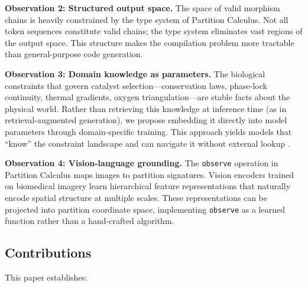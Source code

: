 \documentclass[11pt,twocolumn,a4paper]{article}
\theoremstyle{definition}
\theoremstyle{remark}
\begin{document}
\textbf{Observation 2: Structured output space.} The space of valid morphism chains is heavily constrained by the type system of Partition Calculus. Not all token sequences constitute valid chains; the type system eliminates vast regions of the output space. This structure makes the compilation problem more tractable than general-purpose code generation.

\textbf{Observation 3: Domain knowledge as parameters.} The biological constraints that govern catalyst selection---conservation laws, phase-lock continuity, thermal gradients, oxygen triangulation---are stable facts about the physical world. Rather than retrieving this knowledge at inference time (as in retrieval-augmented generation), we propose embedding it directly into model parameters through domain-specific training. This approach yields models that ``know'' the constraint landscape and can navigate it without external lookup \cite{purpose2024}.

\textbf{Observation 4: Vision-language grounding.} The \texttt{observe} operation in Partition Calculus maps images to partition signatures. Vision encoders trained on biomedical imagery learn hierarchical feature representations that naturally encode spatial structure at multiple scales. These representations can be projected into partition coordinate space, implementing \texttt{observe} as a learned function rather than a hand-crafted algorithm.

\subsection{Contributions}

This paper establishes:
\end{document}
